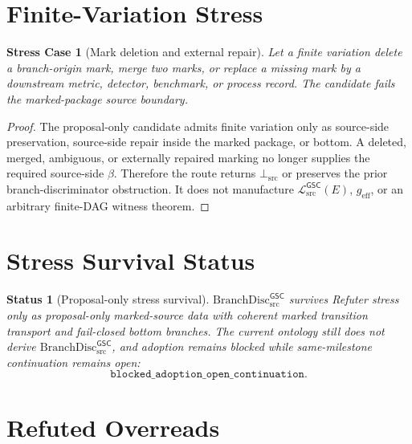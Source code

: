\documentclass[11pt]{article}
\newcommand{\MetricData}{\mathcal{L}_{\mathrm{src}}^{\mathsf{GSC}}}
\newcommand{\BottomSrc}{\bot_{\mathrm{src}}}
\newcommand{\geff}{g_{\mathrm{eff}}}
\newcommand{\BranchDisc}{\mathrm{BranchDisc}_{\mathrm{src}}^{\mathsf{GSC}}}
\newtheorem{stresscase}{Stress Case}
\newtheorem{status}{Status}
\begin{document}
\section{Finite-Variation Stress}

\begin{stresscase}[Mark deletion and external repair]
Let a finite variation delete a branch-origin mark, merge two marks, or
replace a missing mark by a downstream metric, detector, benchmark, or process
record. The candidate fails the marked-package source boundary.
\end{stresscase}

\begin{proof}
The proposal-only candidate admits finite variation only as source-side
preservation, source-side repair inside the marked package, or bottom. A
deleted, merged, ambiguous, or externally repaired marking no longer supplies
the required source-side \(\beta\). Therefore the route returns
\(\BottomSrc\) or preserves the prior branch-discriminator obstruction. It
does not manufacture \(\MetricData(E)\), \(\geff\), or an arbitrary finite-DAG
witness theorem.
\end{proof}

\section{Stress Survival Status}

\begin{status}[Proposal-only stress survival]
\(\BranchDisc\) survives Refuter stress only as proposal-only marked-source
data with coherent marked transition transport and fail-closed bottom
branches. The current ontology still does not derive \(\BranchDisc\), and
adoption remains blocked while same-milestone continuation remains open:
\[
  \texttt{blocked\_adoption\_open\_continuation}.
\]
\end{status}

\section{Refuted Overreads}
\end{document}
